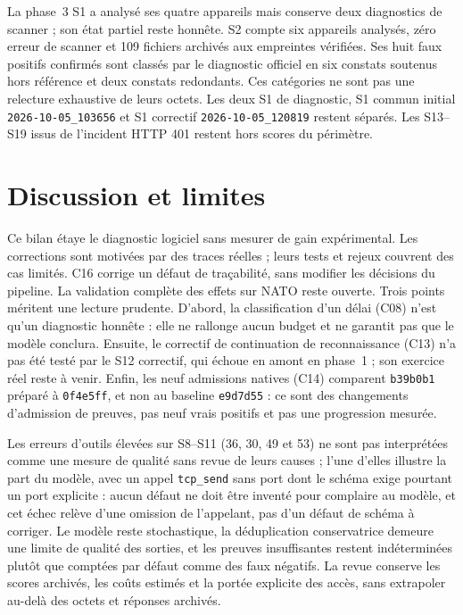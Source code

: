 \documentclass[11pt,a4paper]{article}
\newcommand{\code}[1]{{\urlstyle{tt}\nolinkurl{#1}}}
\begin{document}
\normalsize
La phase~3 S1 a analysé ses quatre appareils mais conserve deux diagnostics de scanner ; son état partiel reste honnête. S2 compte six appareils analysés, zéro erreur de scanner et 109 fichiers archivés aux empreintes vérifiées. Ses huit faux positifs confirmés sont classés par le diagnostic officiel en six constats soutenus hors référence et deux constats redondants. Ces catégories ne sont pas une relecture exhaustive de leurs octets. Les deux S1 de diagnostic, S1 commun initial \code{2026-10-05_103656} et S1 correctif \code{2026-10-05_120819} restent séparés. Les S13--S19 issus de l'incident HTTP 401 restent hors scores du périmètre.

\section{Discussion et limites}
\label{sec:discussion-corrections}

Ce bilan étaye le diagnostic logiciel sans mesurer de gain expérimental. Les corrections sont motivées par des traces réelles ; leurs tests et rejeux couvrent des cas limités. C16 corrige un défaut de traçabilité, sans modifier les décisions du pipeline. La validation complète des effets sur NATO reste ouverte. Trois points méritent une lecture prudente. D'abord, la classification d'un délai (C08) n'est qu'un diagnostic honnête : elle ne rallonge aucun budget et ne garantit pas que le modèle conclura. Ensuite, le correctif de continuation de reconnaissance (C13) n'a pas été testé par le S12 correctif, qui échoue en amont en phase~1 ; son exercice réel reste à venir. Enfin, les neuf admissions natives (C14) comparent \code{b39b0b1} préparé à \code{0f4e5ff}, et non au baseline \code{e9d7d55} : ce sont des changements d'admission de preuves, pas neuf vrais positifs et pas une progression mesurée.

Les erreurs d'outils élevées sur S8--S11 (36, 30, 49 et 53) ne sont pas interprétées comme une mesure de qualité sans revue de leurs causes ; l'une d'elles illustre la part du modèle, avec un appel \code{tcp_send} sans port dont le schéma exige pourtant un port explicite : aucun défaut ne doit être inventé pour complaire au modèle, et cet échec relève d'une omission de l'appelant, pas d'un défaut de schéma à corriger. Le modèle reste stochastique, la déduplication conservatrice demeure une limite de qualité des sorties, et les preuves insuffisantes restent indéterminées plutôt que comptées par défaut comme des faux négatifs. La revue conserve les scores archivés, les coûts estimés et la portée explicite des accès, sans extrapoler au-delà des octets et réponses archivés.
\end{document}
